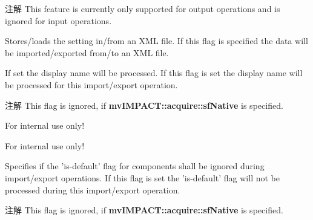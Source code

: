 \begin{Desc}
\begin{description}
\begin{DoxyNote}{注解}
This feature is currently only supported for output operations and is ignored for input operations. 
\end{DoxyNote}
\item[{\em 
\hypertarget{group___common_interface_gga9390ccf3b2ebe68eee998798d59dc823a5be387b740ff59fcc5cbb5c5f9d13818}{sf\+File}\label{group___common_interface_gga9390ccf3b2ebe68eee998798d59dc823a5be387b740ff59fcc5cbb5c5f9d13818}
}]Stores/loads the setting in/from an X\+M\+L file. If this flag is specified the data will be imported/exported from/to an X\+M\+L file. \item[{\em 
\hypertarget{group___common_interface_gga9390ccf3b2ebe68eee998798d59dc823a5d6eb1e2cae5845d15cd3c70673cb219}{sf\+Process\+Display\+Name}\label{group___common_interface_gga9390ccf3b2ebe68eee998798d59dc823a5d6eb1e2cae5845d15cd3c70673cb219}
}]If set the display name will be processed. If this flag is set the display name will be processed for this import/export operation. \begin{DoxyNote}{注解}
This flag is ignored, if {\bfseries mv\+I\+M\+P\+A\+C\+T\+::acquire\+::sf\+Native} is specified. 
\end{DoxyNote}
\item[{\em 
\hypertarget{group___common_interface_gga9390ccf3b2ebe68eee998798d59dc823ac95dd5f35b944fe0b7a8b324cf397696}{sf\+Reserved1}\label{group___common_interface_gga9390ccf3b2ebe68eee998798d59dc823ac95dd5f35b944fe0b7a8b324cf397696}
}]For internal use only! \item[{\em 
\hypertarget{group___common_interface_gga9390ccf3b2ebe68eee998798d59dc823a7d279ffcf4c2abc558ba8cd903a7baee}{sf\+Reserved2}\label{group___common_interface_gga9390ccf3b2ebe68eee998798d59dc823a7d279ffcf4c2abc558ba8cd903a7baee}
}]For internal use only! \item[{\em 
\hypertarget{group___common_interface_gga9390ccf3b2ebe68eee998798d59dc823a05618930605f5d0981bdfe164706004d}{sf\+Dont\+Process\+Default}\label{group___common_interface_gga9390ccf3b2ebe68eee998798d59dc823a05618930605f5d0981bdfe164706004d}
}]Specifies if the 'is-\/default' flag for components shall be ignored during import/export operations. If this flag is set the 'is-\/default' flag will not be processed during this import/export operation. \begin{DoxyNote}{注解}
This flag is ignored, if {\bfseries mv\+I\+M\+P\+A\+C\+T\+::acquire\+::sf\+Native} is specified. 
\end{DoxyNote}
\end{description}
\end{Desc}
